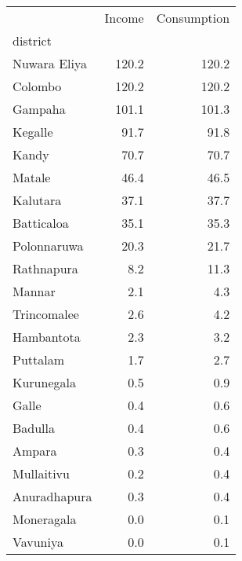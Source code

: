\begin{tabular}{lrr}
\toprule
{} &  Income &  Consumption \\
district     &         &              \\
\midrule
Nuwara Eliya &   120.2 &        120.2 \\
Colombo      &   120.2 &        120.2 \\
Gampaha      &   101.1 &        101.3 \\
Kegalle      &    91.7 &         91.8 \\
Kandy        &    70.7 &         70.7 \\
Matale       &    46.4 &         46.5 \\
Kalutara     &    37.1 &         37.7 \\
Batticaloa   &    35.1 &         35.3 \\
Polonnaruwa  &    20.3 &         21.7 \\
Rathnapura   &     8.2 &         11.3 \\
Mannar       &     2.1 &          4.3 \\
Trincomalee  &     2.6 &          4.2 \\
Hambantota   &     2.3 &          3.2 \\
Puttalam     &     1.7 &          2.7 \\
Kurunegala   &     0.5 &          0.9 \\
Galle        &     0.4 &          0.6 \\
Badulla      &     0.4 &          0.6 \\
Ampara       &     0.3 &          0.4 \\
Mullaitivu   &     0.2 &          0.4 \\
Anuradhapura &     0.3 &          0.4 \\
Moneragala   &     0.0 &          0.1 \\
Vavuniya     &     0.0 &          0.1 \\
\bottomrule
\end{tabular}
